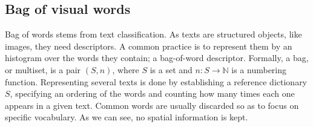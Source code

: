 \documentclass[a4paper]{report}
\begin{document}
\subsection{\label{subsec:BagOfVisualWord}Bag of visual words}
Bag of words stems from text classification. As texts are structured objects, like images, they need descriptors. A common practice is to represent them by an histogram over the words they contain; a bag-of-word descriptor. Formally, a bag, or multiset, is a pair $(S, n)$, where $S$ is a set and $n : S \rightarrow \mathbb{N}$ is a numbering function. Representing several texts is done by establishing a reference dictionary $S$, specifying an ordering of the words and counting how many times each one appears in a given text. Common words are usually discarded so as to focus on specific vocabulary. As we can see, no spatial information is kept.
\end{document}

